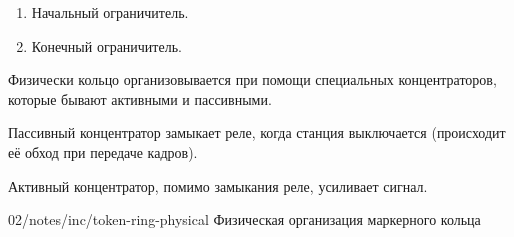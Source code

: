\begin{enumerate}
    \item Начальный ограничитель.
    \item Конечный ограничитель.
\end{enumerate}

Физически кольцо организовывается при помощи специальных концентраторов, которые бывают активными и пассивными.

Пассивный концентратор замыкает реле, когда станция выключается (происходит её обход при передаче кадров).

Активный концентратор, помимо замыкания реле, усиливает сигнал.

\image
{\textwidth}
{02/notes/inc/token-ring-physical}
{Физическая организация маркерного кольца}
